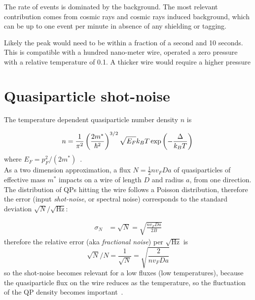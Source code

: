 \documentclass[a4paper,12pt]{article}
\begin{document}
The rate of events is dominated by the background. The most relevant contribution comes from cosmic rays and cosmic rays induced background, which can be up to one event per minute in absence of any shielding or tagging.

Likely the peak would need to be within a fraction of a second and 10 seconds.
This is compatible with a hundred nano-meter wire, operated a zero pressure with a relative temperature of 0.1. A thicker wire would require a higher pressure



\section{Quasiparticle shot-noise}

The temperature dependent quasiparticle number density $n$ is

\begin{equation}
n = \frac{1}{\pi^2} \left( \frac{2m^*}{\hbar^2} \right) ^{3/2} \sqrt{E_F} k_B T \exp \left( {-\frac{\Delta}{k_BT}} \right) \\
\end{equation}
where $E_F = p_F^2/(2m^*)$~\cite{vonka}.\\
As a two dimension approximation, a flux $N=\frac{1}{2}nv_FDa$ of quasiparticles of effective mass $m^*$ impacts on a wire of length $D$ and radius $a$, from one direction.\\
The distribution of QPs hitting the wire follows a Poisson distribution, therefore the error (input \textit{shot-noise}, or spectral noise) corresponds to the standard deviation $\sqrt{N}/\sqrt{\mathrm{Hz}}$:

\begin{align}
\sigma_N &= \sqrt{N} = \sqrt{\frac{nv_FDa}{2B}}
\end{align}
therefore the relative error (aka \textit{fractional noise}) per $\sqrt{\mathrm{Hz}}$ is
\begin{equation}
  \sqrt{N}/N = \frac{1}{\sqrt{N}} = \sqrt{\frac{2}{n v_F D a}}
\end{equation}
so the shot-noise becomes relevant for a low fluxes (low temperatures), because the quasiparticle flux on the wire reduces as the temperature, so the fluctuation of the QP density becomes important~\cite{bradley}.
\end{document}
